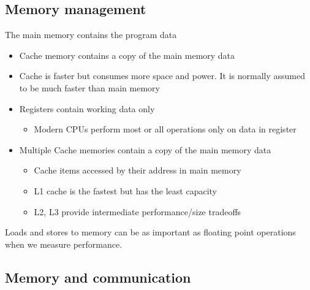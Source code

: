 \documentclass[%
oneside,                 %
final,                   %
10pt]{article}
\begin{document}
\subsection*{Memory management}
The main memory contains the program data
\begin{itemize}
\item Cache memory contains a copy of the main memory data

\item Cache is faster but consumes more space and power. It is normally assumed to be much faster than main memory

\item Registers contain working data only
\begin{itemize}

 \item Modern CPUs perform most or all operations only on data in register

\end{itemize}

\noindent
\item Multiple Cache memories contain a copy of the main memory data
\begin{itemize}

 \item Cache items accessed by their address in main memory

 \item L1 cache is the fastest but has the least capacity

 \item L2, L3 provide intermediate performance/size tradeoffs
\end{itemize}

\noindent
\end{itemize}

\noindent
Loads and stores to memory can be as important as floating point operations when we measure performance.


\subsection*{Memory and communication}
\end{document}
